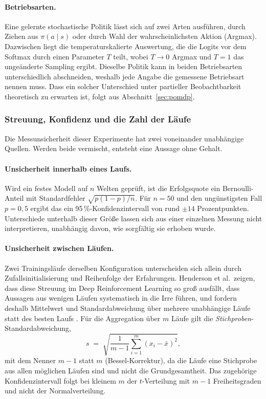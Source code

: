 \documentclass[11pt,a4paper]{article}
\begin{document}
\paragraph{Betriebsarten.}
Eine gelernte stochastische Politik lässt sich auf zwei Arten ausführen, durch
Ziehen aus $\pi(a \mid s)$ oder durch Wahl der wahrscheinlichsten Aktion
(Argmax). Dazwischen liegt die temperaturskalierte Auswertung, die die Logits
vor dem Softmax durch einen Parameter $T$ teilt, wobei $T \to 0$ Argmax und
$T = 1$ das ungeänderte Sampling ergibt. Dieselbe Politik kann in beiden
Betriebsarten unterschiedlich abschneiden, weshalb jede Angabe die gemessene
Betriebsart nennen muss. Dass ein solcher Unterschied unter partieller
Beobachtbarkeit theoretisch zu erwarten ist, folgt aus
Abschnitt~\ref{sec:pomdp}.

\subsubsection{Streuung, Konfidenz und die Zahl der Läufe}
\label{sec:g_streuung}

Die Messunsicherheit dieser Experimente hat zwei voneinander unabhängige
Quellen. Werden beide vermischt, entsteht eine Aussage ohne Gehalt.

\paragraph{Unsicherheit innerhalb eines Laufs.}
Wird ein festes Modell auf $n$ Welten geprüft, ist die Erfolgsquote ein
Bernoulli-Anteil mit Standardfehler $\sqrt{p(1-p)/n}$. Für $n = 50$ und den
ungünstigsten Fall $p = 0{,}5$ ergibt das ein 95\,\%-Konfidenzintervall von rund
$\pm 14$ Prozentpunkten. Unterschiede unterhalb dieser Größe lassen sich aus
einer einzelnen Messung nicht interpretieren, unabhängig davon, wie sorgfältig
sie erhoben wurde.

\paragraph{Unsicherheit zwischen Läufen.}
Zwei Trainingsläufe derselben Konfiguration unterscheiden sich allein durch
Zufallsinitialisierung und Reihenfolge der Erfahrungen. Henderson et al.\
zeigen, dass diese Streuung im Deep Reinforcement Learning so groß ausfällt,
dass Aussagen aus wenigen Läufen systematisch in die Irre führen, und fordern
deshalb Mittelwert und Standardabweichung über mehrere unabhängige Läufe statt
des besten Laufs \cite{henderson2018matters}. Für die Aggregation über $m$
Läufe gilt die \emph{Stichproben}-Standardabweichung,
\begin{equation}
s \;=\; \sqrt{\frac{1}{m-1}\sum_{i=1}^{m}\left(x_i - \bar{x}\right)^2},
\end{equation}
mit dem Nenner $m-1$ statt $m$ (Bessel-Korrektur), da die Läufe eine Stichprobe
aus allen möglichen Läufen sind und nicht die Grundgesamtheit. Das zugehörige
Konfidenzintervall folgt bei kleinem $m$ der $t$-Verteilung mit $m-1$
Freiheitsgraden und nicht der Normalverteilung.
\end{document}
